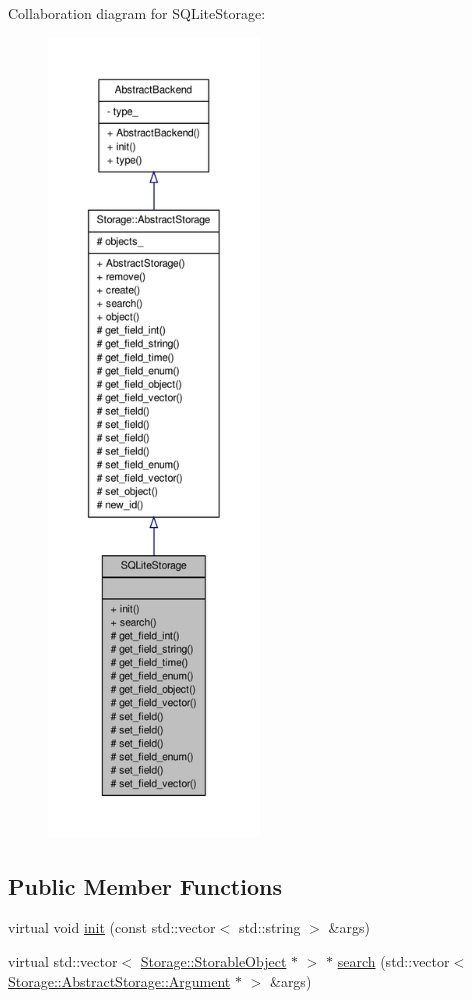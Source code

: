 Collaboration diagram for SQLiteStorage:
\nopagebreak
\begin{figure}[H]
\begin{center}
\leavevmode
\includegraphics[height=600pt]{d3/dc2/classSQLiteStorage__coll__graph}
\end{center}
\end{figure}
\subsection*{Public Member Functions}
\begin{DoxyCompactItemize}
\item 
virtual void \hyperlink{classSQLiteStorage_a1abd27f3824567fef222479a7c7a2333}{init} (const std::vector$<$ std::string $>$ \&args)
\item 
virtual std::vector$<$ \hyperlink{classStorage_1_1StorableObject}{Storage::StorableObject} $\ast$ $>$ $\ast$ \hyperlink{classSQLiteStorage_ae3b74f8ac83d9f0c9d5cadc66daab68e}{search} (std::vector$<$ \hyperlink{structStorage_1_1AbstractStorage_1_1Argument}{Storage::AbstractStorage::Argument} $\ast$ $>$ \&args)
\end{DoxyCompactItemize}
